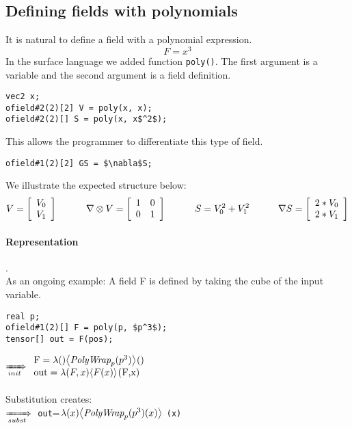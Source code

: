 \subsection{Defining fields with polynomials}
It is natural to define a field with a polynomial expression. $$F = x^3$$
In the surface language we added function \lstinline[mathescape=true]!poly()!.
The first argument is a variable and the second argument is a field definition.
\begin{lstlisting}[mathescape=true]
vec2 x;
ofield#2(2)[2] V = poly(x, x);
ofield#2(2)[] S = poly(x, x$^2$);
\end{lstlisting}
This allows the programmer to differentiate this type of field.
\begin{lstlisting}[mathescape=true]
ofield#1(2)[2] GS = $\nabla$S;
\end{lstlisting}
We illustrate the expected structure below:
\begin{displaymath}
  V=\left[ \begin{array}{ll}
  V_0 \\  V_1  \\
  \end{array}
 \right]   \indent\indent 
  \nabla \otimes V=\left[ \begin{array}{ll}
 1&   0 \\  0  &  1  \\
  \end{array}
 \right]   \indent\indent 
   S=  V_0 ^2+  V_1^2  \\
  \indent\indent
    \nabla S=\left[ \begin{array}{ll}
  2*V_0 \\  2*V_1  \\
  \end{array}
 \right] 
 \end{displaymath}

\paragraph{Representation}.\\
As an ongoing example:
A field F is defined by taking the cube of the input variable.\begin{lstlisting}[mathescape=true]
real p; 
ofield#1(2)[] F = poly(p, $p^3$);
tensor[] out = F(pos);
\end{lstlisting}

$\rewriteInitA \begin{array}{ll} \lstinline[mathescape=true]!F!=\lambda ()\EinExp{\expPolyWrap{p}{{p}^3}}{}()\\
\lstinline[mathescape=true]!out!=\lambda(F,x) \EinExp{F(x)}{}\lstinline[mathescape=true]!(F,x)!\end{array}$\\
\\
Substitution creates:\\
$\xRightarrow[subst]{}{}$ \lstinline[mathescape=true]!out!=$\lambda(x) {\left\langle{\textit{PolyWrap}_{p}({p^3})(x)}\right\rangle}_{}$
\lstinline[mathescape=true]!(x)!
